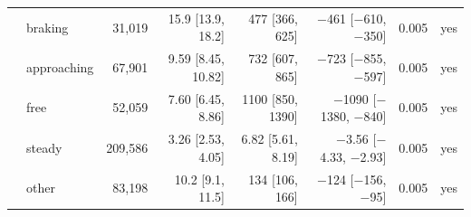\begin{longtable}{llrrrrrl}
 & braking & 31,019 & 15.9 [13.9, 18.2] & 477 [366, 625] & $-$461 [$-$610, $-$350] & 0.005 & yes \\
 & approaching & 67,901 & 9.59 [8.45, 10.82] & 732 [607, 865] & $-$723 [$-$855, $-$597] & 0.005 & yes \\
 & free & 52,059 & 7.60 [6.45, 8.86] & 1100 [850, 1390] & $-$1090 [$-$1380, $-$840] & 0.005 & yes \\
 & steady & 209,586 & 3.26 [2.53, 4.05] & 6.82 [5.61, 8.19] & $-$3.56 [$-$4.33, $-$2.93] & 0.005 & yes \\
 & other & 83,198 & 10.2 [9.1, 11.5] & 134 [106, 166] & $-$124 [$-$156, $-$95] & 0.005 & yes \\
\end{longtable}
\endgroup
